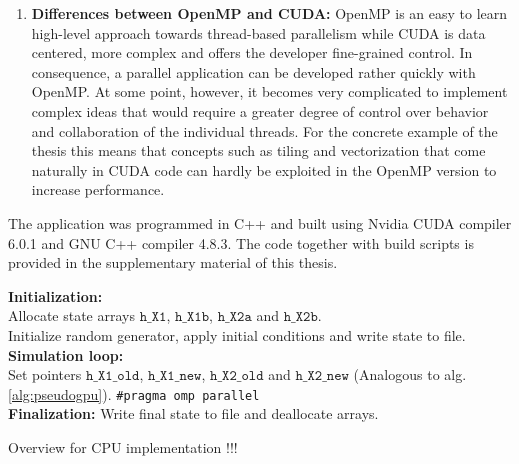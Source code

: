 \begin{enumerate}
\begin{enumerate}
\end{enumerate}
\item \textbf{Differences between OpenMP and CUDA:} OpenMP is an easy to learn high-level approach towards thread-based parallelism while CUDA is data centered, more complex and offers the developer fine-grained control. In consequence, a parallel application can be developed rather quickly with OpenMP. At some point, however, it becomes very complicated to implement complex ideas that would require a greater degree of control over behavior and collaboration of the individual threads. For the concrete example of the thesis this means that concepts such as tiling and vectorization that come naturally in CUDA code can hardly be exploited in the OpenMP version to increase performance. 
\end{enumerate}

The application was programmed in C++ and built using Nvidia CUDA compiler 6.0.1 and GNU C++ compiler 4.8.3. The code together with build scripts is provided in the supplementary material of this thesis. 
\newpage

\begin{algorithm}[H]
\DontPrintSemicolon
\textbf{Initialization:} \\
Allocate state arrays $\mathtt{h\_X1}$, $\mathtt{h\_X1b}$, $\mathtt{h\_X2a}$ and $\mathtt{h\_X2b}$. \\
Initialize random generator, apply initial conditions and write state to file.\;
\textbf{Simulation loop:}\\
Set pointers $\mathtt{h\_X1\_old}$, $\mathtt{h\_X1\_new}$, $\mathtt{h\_X2\_old}$ and $\mathtt{h\_X2\_new}$ (Analogous to alg. \ref{alg:pseudogpu}). \;
\texttt{\#pragma omp parallel} \\
\textbf{Finalization:} 
Write final state to file and deallocate arrays. \;
\caption{Overview for CPU implementation !!!}
\label{alg:pseudocpu}
\end{algorithm}
